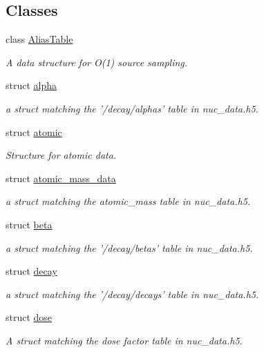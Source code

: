 \subsection*{Classes}
\begin{DoxyCompactItemize}
\item 
class \hyperlink{classpyne_1_1_alias_table}{Alias\+Table}
\begin{DoxyCompactList}\small\item\em A data structure for O(1) source sampling. \end{DoxyCompactList}\item 
struct \hyperlink{structpyne_1_1alpha}{alpha}
\begin{DoxyCompactList}\small\item\em a struct matching the '/decay/alphas' table in nuc\+\_\+data.\+h5. \end{DoxyCompactList}\item 
struct \hyperlink{structpyne_1_1atomic}{atomic}
\begin{DoxyCompactList}\small\item\em Structure for atomic data. \end{DoxyCompactList}\item 
struct \hyperlink{structpyne_1_1atomic__mass__data}{atomic\+\_\+mass\+\_\+data}
\begin{DoxyCompactList}\small\item\em a struct matching the atomic\+\_\+mass table in nuc\+\_\+data.\+h5. \end{DoxyCompactList}\item 
struct \hyperlink{structpyne_1_1beta}{beta}
\begin{DoxyCompactList}\small\item\em a struct matching the '/decay/betas' table in nuc\+\_\+data.\+h5. \end{DoxyCompactList}\item 
struct \hyperlink{structpyne_1_1decay}{decay}
\begin{DoxyCompactList}\small\item\em a struct matching the '/decay/decays' table in nuc\+\_\+data.\+h5. \end{DoxyCompactList}\item 
struct \hyperlink{structpyne_1_1dose}{dose}
\begin{DoxyCompactList}\small\item\em A struct matching the dose factor table in nuc\+\_\+data.\+h5. \end{DoxyCompactList}\item 

\end{DoxyCompactItemize}
